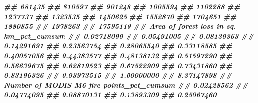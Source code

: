 \documentclass[10pt,landscape,a3paper]{article}
\newenvironment{Shaded}{\begin{snugshade}}{\end{snugshade}}
\newcommand{\DocumentationTok}[1]{\textcolor[rgb]{0.56,0.35,0.01}{\textbf{\textit{#1}}}}
\begin{document}
\begin{Shaded}
\begin{Highlighting}[]
\DocumentationTok{\#\#                                      681435}
\DocumentationTok{\#\#                                      810597}
\DocumentationTok{\#\#                                      901248}
\DocumentationTok{\#\#                                     1005594}
\DocumentationTok{\#\#                                     1102288}
\DocumentationTok{\#\#                                     1237737}
\DocumentationTok{\#\#                                     1323535}
\DocumentationTok{\#\#                                     1450625}
\DocumentationTok{\#\#                                     1552870}
\DocumentationTok{\#\#                                     1704651}
\DocumentationTok{\#\#                                     1880855}
\DocumentationTok{\#\#                                     1978263}
\DocumentationTok{\#\#                                    17595119}
\DocumentationTok{\#\#  Area of forest loss in sq. km\_pct\_cumsum}
\DocumentationTok{\#\#                                0.02718099}
\DocumentationTok{\#\#                                0.05491005}
\DocumentationTok{\#\#                                0.08139363}
\DocumentationTok{\#\#                                0.14291691}
\DocumentationTok{\#\#                                0.23563754}
\DocumentationTok{\#\#                                0.28065540}
\DocumentationTok{\#\#                                0.33118585}
\DocumentationTok{\#\#                                0.40057056}
\DocumentationTok{\#\#                                0.44383577}
\DocumentationTok{\#\#                                0.48138132}
\DocumentationTok{\#\#                                0.51597290}
\DocumentationTok{\#\#                                0.56639675}
\DocumentationTok{\#\#                                0.62819523}
\DocumentationTok{\#\#                                0.67522909}
\DocumentationTok{\#\#                                0.73431860}
\DocumentationTok{\#\#                                0.83196326}
\DocumentationTok{\#\#                                0.93973515}
\DocumentationTok{\#\#                                1.00000000}
\DocumentationTok{\#\#                                8.37147898}
\DocumentationTok{\#\#  Number of MODIS M6 fire points\_pct\_cumsum}
\DocumentationTok{\#\#                                 0.02428562}
\DocumentationTok{\#\#                                 0.04774095}
\DocumentationTok{\#\#                                 0.08870131}
\DocumentationTok{\#\#                                 0.13893309}
\DocumentationTok{\#\#                                 0.25067460}

\end{Highlighting}
\end{Shaded}
\end{document}
